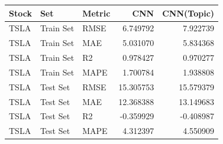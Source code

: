 \begin{tabular}{lllrr}
\toprule
Stock & Set & Metric & CNN & CNN(Topic) \\
\midrule
TSLA & Train Set & RMSE & 6.749792 & 7.922739 \\
TSLA & Train Set & MAE & 5.031070 & 5.834368 \\
TSLA & Train Set & R2 & 0.978427 & 0.970277 \\
TSLA & Train Set & MAPE & 1.700784 & 1.938808 \\
TSLA & Test Set & RMSE & 15.305753 & 15.579379 \\
TSLA & Test Set & MAE & 12.368388 & 13.149683 \\
TSLA & Test Set & R2 & -0.359929 & -0.408987 \\
TSLA & Test Set & MAPE & 4.312397 & 4.550909 \\
\bottomrule
\end{tabular}

